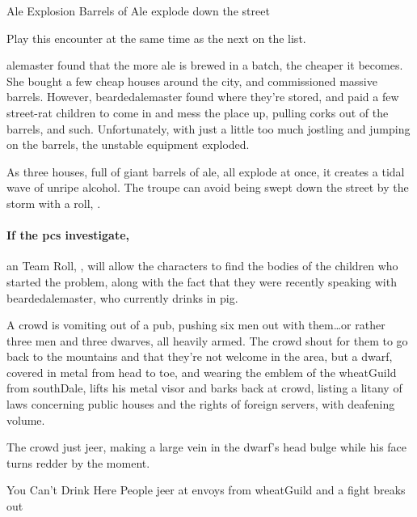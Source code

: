 {\squash Ale Explosion}%
{Barrels of Ale explode down the street}%

Play this encounter at the same time as the next on the list.

\Gls{alemaster} found that the more ale is brewed in a batch, the cheaper it becomes.
She bought a few cheap houses around the city, and commissioned massive barrels.
However, \gls{beardedalemaster} found where they're stored, and paid a few street-rat children to come in and mess the place up, pulling corks out of the barrels, and such.
Unfortunately, with just a little too much jostling and jumping on the barrels, the unstable equipment exploded.

As three houses, full of giant barrels of ale, all explode at once, it creates a tidal wave of unripe alcohol.
The troupe can avoid being swept down the street by the storm with a  roll, \tn[8].

\paragraph{If the \glspl{pc} investigate,}
an  Team Roll, \tn[10], will allow the characters to find the bodies of the children who started the problem, along with the fact that they were recently speaking with \gls{beardedalemaster}, who currently drinks in \gls{pig}.%
\iftoggle{core}%
{\footnote{See the Core Rules, \autopageref{teamwork}, for Team Rolls.}}%
{}%

\begin{boxtext}

  A crowd is vomiting out of a pub, pushing six men out with them\ldots or rather three men and three dwarves, all heavily armed.
  The crowd shout for them to go back to the mountains and that they're not welcome in the area, but a dwarf, covered in metal from head to toe, and wearing the emblem of the \gls{wheatGuild} from \gls{southDale}, lifts his metal visor and barks back at crowd, listing a litany of laws concerning public houses and the rights of foreign \glspl{server}, with deafening volume.

  The crowd just jeer, making a large vein in the dwarf's head bulge while his face turns redder by the moment.

\end{boxtext}

{You Can't Drink Here}%
{People jeer at envoys from  \gls{wheatGuild} and a fight breaks out}%

